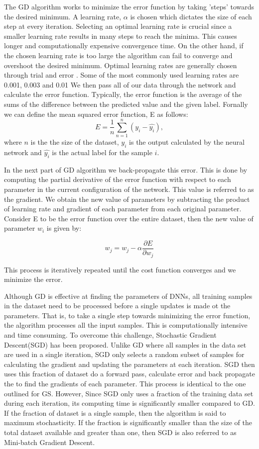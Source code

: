 \documentclass[conference]{IEEEtran}
\begin{document}
The GD algorithm works to minimize the error function by taking 'steps' towards the desired minimum. A learning rate, $\alpha$ is chosen which dictates the size of each step at every iteration.
Selecting an optimal learning rate is crucial since a smaller learning rate results in many steps to reach the minima. This causes longer and computationally expensive convergence time.
On the other hand, if the chosen learning rate is too large the algorithm can fail to converge and overshoot the desired minimum. 
Optimal learning rates are generally chosen through trial and error . Some of the most commonly used learning rates are 0.001, 0.003 and 0.01
We then pass all of our data through the network and calculate the error function. Typically, the error function is the average of the sums of the difference between the predicted value and the given label. Fornally we can define the mean squared error function, E as follows:
$$ E= \frac{1}{n} \sum_{n=1}^{n}(y_i -\hat{y_i}),$$
where $n$ is the the size of the dataset, $y_i$ is the output calculated by the neural network and $\hat{y_i}$ is the actual label for the sample $i$.

In the next part of GD algorithm we back-propagate this error. This is done by computing the partial derivative of the error function with respect to each parameter in the current configuration of the network. This value is referred to as the gradient. We obtain the new value of parameters by subtracting the product of learning rate and gradient of each parameter from each original parameter. 
Consider E to be the error function over the entire dataset, then the new value of parameter $w_i$ is given by:

 $$w_j = w_j -\alpha \frac{\partial E}{\partial w_j} $$

This process is iteratively repeated until the cost function converges and we minimize the error.

Although GD is effective at finding the parameters of DNNs, all  training samples in the dataset need to be processed before a single updates is made ot the parameters. That is,  to take a single step towards minimizing the error function, the algorithm processes all the input samples. This is computationally intensive and time consuming. To overcome this challenge, Stochastic Gradient Descent(SGD) has been
proposed. Unlike GD where all samples in the data set are used in a single iteration, SGD only selects a random subset
of samples for calculating the gradient and updating the parameters at each iteration. SGD then uses this fraction of dataset do a forward pass, calculate error and back propagate the to find the gradients of each parameter. This process is identical to the one outlined for GS. 
However, Since SGD only uses a fraction of the training
data set during each iteration, its computing time is significantly smaller compared to GD. If the fraction of dataset is a single sample, then the algorithm is said to maximum stochasticity. If the fraction is significantly smaller than the size of the total dataset available and greater than one, then SGD is also referred to as Mini-batch Gradient Descent.
\end{document}
